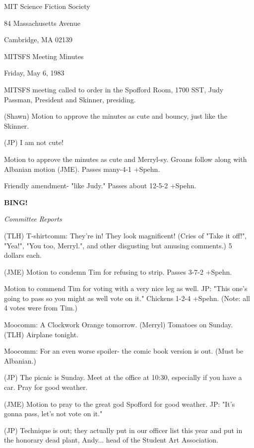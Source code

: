 \documentclass[12pt]{article}
\newcommand{\bing}{{\bf BING!} }
\newcommand{\goto}[1]{\bing \vskip 12pt \centerline{{\em{#1}}}}
\begin{document}
\begin{center}

MIT Science Fiction Society 

84 Massachusetts Avenue

Cambridge, MA 02139

\vspace{12pt}

MITSFS Meeting Minutes 

Friday, May 6, 1983

\end{center}
 
\vspace{18pt}

\setlength{\parskip}{6pt}

\noindent
MITSFS meeting called to order in the Spofford Room, 1700 SST,
Judy Passman, President and Skinner, presiding.

(Shawn) Motion to approve the minutes as cute and bouncy, just like the Skinner.

(JP) I am not cute!

Motion to approve the minutes as cute and Merryl-sy. Groans follow along with Albanian motion (JME). Passes many-4-1 +Spehn.

Friendly amendment- "like Judy." Passes about 12-5-2 +Spehn.

\goto{Committee Reports}

(TLH) T-shirtcomm: They're in! They look magnificent! (Cries of "Take it off!", "Yea!", "You too, Merryl.", and other disgusting but amusing comments.) 5 dollars each.

(JME) Motion to condemn Tim for refusing to strip. Passes 3-7-2 +Spehn.

Motion to commend Tim for voting with a very nice leg as well. JP: "This one's going to pass so you might as well vote on it." Chickens 1-2-4 +Spehn. (Note: all 4 votes were from Tim.)

Moocomm: A Clockwork Orange tomorrow. (Merryl) Tomatoes on Sunday. (TLH) Airplane tonight.

Moocomm: For an even worse spoiler- the comic book version is out. (Must be Albanian.)

(JP) The picnic is Sunday. Meet at the office at 10:30, especially if you have a car. Pray for good weather.

(JME) Motion to pray to the great god Spofford for good weather. JP: "It's gonna pass, let's not vote on it."

(JP) Technique is out; they actually put in our officer list this year and put in the honorary dead plant, Andy... head of the Student Art Association.
\end{document}
